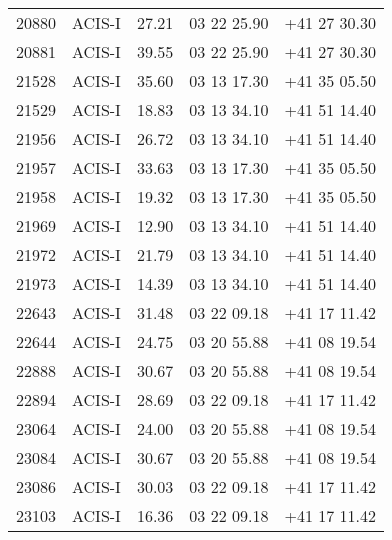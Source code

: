 \begin{supertabular}{rlrll}
  20880 &     ACIS-I &          27.21 & 03 22 25.90 & +41 27 30.30 \\
  20881 &     ACIS-I &          39.55 & 03 22 25.90 & +41 27 30.30 \\
  21528 &     ACIS-I &          35.60 & 03 13 17.30 & +41 35 05.50 \\
  21529 &     ACIS-I &          18.83 & 03 13 34.10 & +41 51 14.40 \\
  21956 &     ACIS-I &          26.72 & 03 13 34.10 & +41 51 14.40 \\
  21957 &     ACIS-I &          33.63 & 03 13 17.30 & +41 35 05.50 \\
  21958 &     ACIS-I &          19.32 & 03 13 17.30 & +41 35 05.50 \\
  21969 &     ACIS-I &          12.90 & 03 13 34.10 & +41 51 14.40 \\
  21972 &     ACIS-I &          21.79 & 03 13 34.10 & +41 51 14.40 \\
  21973 &     ACIS-I &          14.39 & 03 13 34.10 & +41 51 14.40 \\
  22643 &     ACIS-I &          31.48 & 03 22 09.18 & +41 17 11.42 \\
  22644 &     ACIS-I &          24.75 & 03 20 55.88 & +41 08 19.54 \\
  22888 &     ACIS-I &          30.67 & 03 20 55.88 & +41 08 19.54 \\
  22894 &     ACIS-I &          28.69 & 03 22 09.18 & +41 17 11.42 \\
  23064 &     ACIS-I &          24.00 & 03 20 55.88 & +41 08 19.54 \\
  23084 &     ACIS-I &          30.67 & 03 20 55.88 & +41 08 19.54 \\
  23086 &     ACIS-I &          30.03 & 03 22 09.18 & +41 17 11.42 \\
  23103 &     ACIS-I &          16.36 & 03 22 09.18 & +41 17 11.42 \\
\bottomrule
\end{supertabular}
